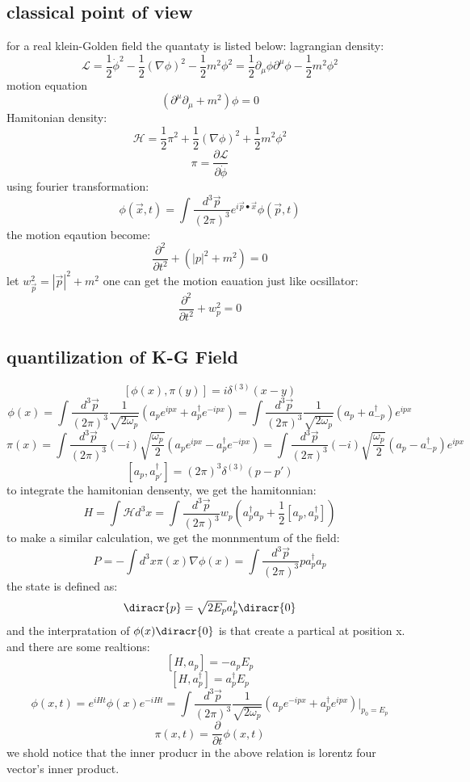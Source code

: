\subsection{classical point of view}
for a real klein-Golden field the quantaty is listed below:
lagrangian density:
\[\mathcal{L}=\frac{1}{2}\dot{\phi}^2-\frac{1}{2}(\nabla\phi)^2-\frac{1}{2}m^2\phi^2=\frac{1}{2}\partial_{\mu}\phi\partial^{\mu}\phi-\frac{1}{2}m^2\phi^2\]
motion equation
\[(\partial^{\mu}\partial_{\mu}+m^2)\phi=0\]
Hamitonian density:
\[\mathcal{H}=\frac{1}{2}\pi^2+\frac{1}{2}(\nabla\phi)^2+\frac{1}{2}m^2\phi^2\]
\[\pi=\frac{\partial \mathcal{L}}{\partial\dot{\phi}}\]
using fourier transformation:
\[\phi(\vec{x},t)=\int \frac{d^3\vec{p}}{(2\pi)^3} e^{i\vec{p}\bullet\vec{x}}\phi(\vec{p},t)\]
the motion eqaution become:
\[\frac{\partial^2}{\partial t^2}+(|p|^2+m^2)=0\]
let $w_{\vec{p}}^2=|\vec{p}|^2+m^2$ one can get the motion eauation just like ocsillator:
\[\frac{\partial^2}{\partial t^2}+w_p^2=0\]

\subsection{quantilization of K-G Field}
\[[\phi(x),\pi(y)]=i\delta^{(3)}(x-y)\]
\[\phi(x)=\int \frac{d^3\vec{p}}{(2\pi)^3}\frac{1}{\sqrt{2\omega_p}}(a_p e^{ipx}+a_p^{\dagger}e^{-ipx})=\int \frac{d^3\vec{p}}{(2\pi)^3}\frac{1}{\sqrt{2\omega_p}}(a_p+a_{-p}^{\dagger})e^{ipx}\]
\[\pi(x)=\int \frac{d^3\vec{p}}{(2\pi)^3}(-i)\sqrt{\frac{\omega_p}{2}}(a_p e^{ipx}-a_p^{\dagger}e^{-ipx})=\int \frac{d^3\vec{p}}{(2\pi)^3}(-i)\sqrt{\frac{\omega_p}{2}}(a_p-a_{-p}^{\dagger})e^{ipx}\]
\[[a_p,a_{p'}^{\dagger}]=(2\pi)^3\delta^{(3)}(p-p')\]
to integrate the hamitonian densenty, we get the hamitonnian:
\[H=\int \mathcal{H}d^3x=\int \frac{d^3\vec{p}}{(2\pi)^3}w_p(a_p^{\dagger}a_p+\frac{1}{2}[a_p,a_p^{\dagger}])\]
to make a similar calculation, we get the monnmentum of the field:
\[P=-\int d^3x \pi(x)\nabla\phi(x)=\int\frac{d^3\vec{p}}{(2\pi)^3}pa_p^{\dagger}a_p\]
the state is defined as:
\[\diracr{p}=\sqrt{2E_p}a_p^{\dagger}\diracr{0}\]
and the interpratation of $\phi(x)\diracr{0}$ is that create a partical at position x.
and there are some realtions:
\[[H,a_p]=-a_pE_p\]
\[[H,a_p^{\dagger}]=a_p^{\dagger}E_p\]
\[\phi(x,t)=e^{iHt}\phi(x)e^{-iHt}=\int \frac{d^3\vec{p}}{(2\pi)^3}\frac{1}{\sqrt{2\omega_p}}(a_p e^{-ipx}+a_p^{\dagger}e^{ipx})|_{p_0=E_p}\]
\[\pi(x,t)=\frac{\partial}{\partial t}\phi(x,t)\]
we shold notice that the inner producr in the above relation is lorentz four vector's inner product.

